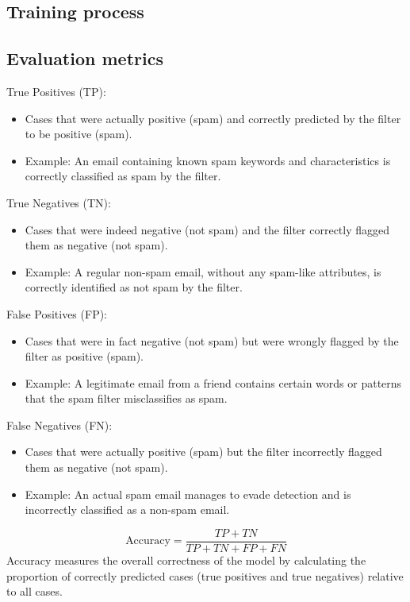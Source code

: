 \subsection{Training process}

\subsection{Evaluation metrics}
True Positives (TP):
\begin{itemize}
  \item Cases that were actually positive (spam) and correctly predicted by the filter to be positive (spam).
  \item Example: An email containing known spam keywords and characteristics is correctly classified as spam by the filter.
\end{itemize}

True Negatives (TN):
\begin{itemize}
  \item Cases that were indeed negative (not spam) and the filter correctly flagged them as negative (not spam).
  \item Example: A regular non-spam email, without any spam-like attributes, is correctly identified as not spam by the filter.
\end{itemize}

False Positives (FP):
\begin{itemize}
  \item Cases that were in fact negative (not spam) but were wrongly flagged by the filter as positive (spam).
  \item Example: A legitimate email from a friend contains certain words or patterns that the spam filter misclassifies as spam.
\end{itemize}

False Negatives (FN):
\begin{itemize}
  \item Cases that were actually positive (spam) but the filter incorrectly flagged them as negative (not spam).
  \item Example: An actual spam email manages to evade detection and is incorrectly classified as a non-spam email.
\end{itemize}

\[
\text{Accuracy} = \frac{TP + TN}{TP + TN + FP + FN}
\]
Accuracy measures the overall correctness of the model by calculating the proportion of correctly predicted cases (true positives and true negatives) relative to all cases.

